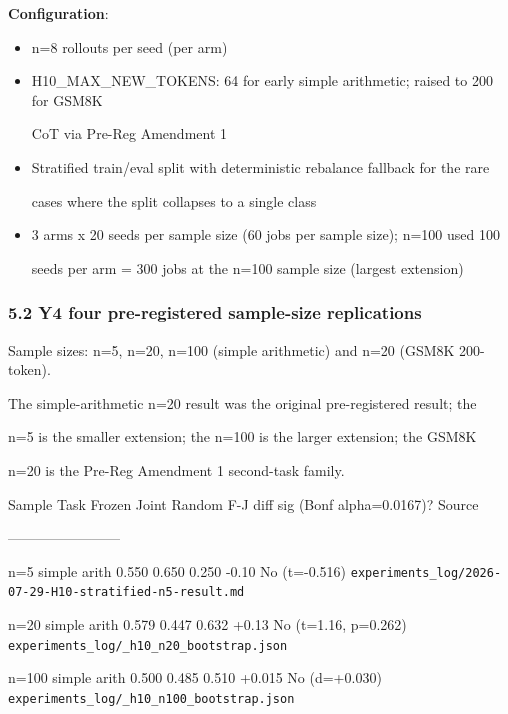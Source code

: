 \documentclass[11pt]{article}
\begin{document}
\textbf{Configuration}:

\begin{itemize}
\item
  n=8 rollouts per seed (per arm)
\item
  H10\_MAX\_NEW\_TOKENS: 64 for early simple arithmetic; raised to 200
  for GSM8K

  CoT via Pre-Reg Amendment 1
\item
  Stratified train/eval split with deterministic rebalance fallback for
  the rare

  cases where the split collapses to a single class
\item
  3 arms x 20 seeds per sample size (60 jobs per sample size); n=100
  used 100

  seeds per arm = 300 jobs at the n=100 sample size (largest extension)
\end{itemize}

\subsubsection{5.2 Y4 four pre-registered sample-size
replications}\label{y4-four-pre-registered-sample-size-replications}

Sample sizes: n=5, n=20, n=100 (simple arithmetic) and n=20 (GSM8K
200-token).

The simple-arithmetic n=20 result was the original pre-registered
result; the

n=5 is the smaller extension; the n=100 is the larger extension; the
GSM8K

n=20 is the Pre-Reg Amendment 1 second-task family.

Sample \textbar{} Task \textbar{} Frozen \textbar{} Joint \textbar{}
Random \textbar{} F-J diff \textbar{} sig (Bonf alpha=0.0167)?
\textbar{} Source \textbar{}

\textbar---\textbar---\textbar---\textbar---\textbar---\textbar---\textbar---\textbar---\textbar{}

n=5 \textbar{} simple arith \textbar{} 0.550 \textbar{} 0.650 \textbar{}
0.250 \textbar{} -0.10 \textbar{} No (t=-0.516) \textbar{}
\texttt{experiments\_log/2026-07-29-H10-stratified-n5-result.md}
\textbar{}

n=20 \textbar{} simple arith \textbar{} 0.579 \textbar{} 0.447
\textbar{} 0.632 \textbar{} +0.13 \textbar{} No (t=1.16, p=0.262)
\textbar{} \texttt{experiments\_log/\_h10\_n20\_bootstrap.json}
\textbar{}

n=100 \textbar{} simple arith \textbar{} 0.500 \textbar{} 0.485
\textbar{} 0.510 \textbar{} +0.015 \textbar{} No (d=+0.030) \textbar{}
\texttt{experiments\_log/\_h10\_n100\_bootstrap.json} \textbar{}
\end{document}
